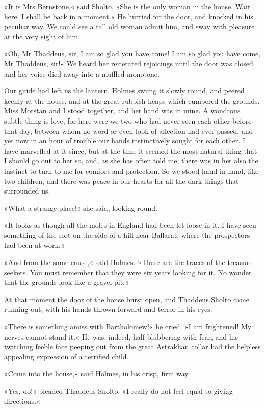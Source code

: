 »It is Mrs Bernstone,« said Sholto. »She is the only woman in the house. Wait here. I shall be back in a moment.« He hurried for the door, and knocked in his peculiar way. We could see a tall old woman admit him, and sway with pleasure at the very sight of him.

»Oh, Mr Thaddeus, sir, I am so glad you have come! I am so glad you have come, Mr Thaddeus, sir!« We heard her reiterated rejoicings until the door was closed and her voice died away into a muffled monotone.

Our guide had left us the lantern. Holmes swung it slowly round, and peered keenly at the house, and at the great rubbish-heaps which cumbered the grounds. Miss Morstan and I stood together, and her hand was in mine. A wondrous subtle thing is love, for here were we two who had never seen each other before that day, between whom no word or even look of affection had ever passed, and yet now in an hour of trouble our hands instinctively sought for each other. I have marvelled at it since, but at the time it seemed the most natural thing that I should go out to her so, and, as she has often told me, there was in her also the instinct to turn to me for comfort and protection. So we stood hand in hand, like two children, and there was peace in our hearts for all the dark things that surrounded us.

»What a strange place!« she said, looking round.

»It looks as though all the moles in England had been let loose in it. I have seen something of the sort on the side of a hill near Ballarat, where the prospectors had been at work.«

»And from the same cause,« said Holmes. »These are the traces of the treasure-seekers. You must remember that they were six years looking for it. No wonder that the grounds look like a gravel-pit.«

At that moment the door of the house burst open, and Thaddeus Sholto came running out, with his hands thrown forward and terror in his eyes.

»There is something amiss with Bartholomew!« he cried. »I am frightened! My nerves cannot stand it.« He was, indeed, half blubbering with fear, and his twitching feeble face peeping out from the great Astrakhan collar had the helpless appealing expression of a terrified child.

»Come into the house,« said Holmes, in his crisp, firm way.

»Yes, do!« pleaded Thaddeus Sholto. »I really do not feel equal to giving directions.«

